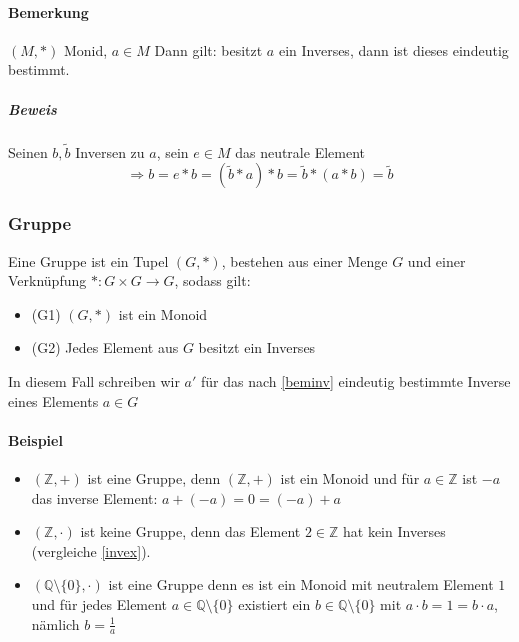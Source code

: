 \documentclass[a4paper]{scrartcl}
\begin{document}
\paragraph{Bemerkung}
\label{sec-3-1-3-2}
\label{beminv}
$(M,*)$ Monid, $a\in M$ Dann gilt: besitzt $a$ ein Inverses, dann ist dieses eindeutig bestimmt.
\subparagraph{Beweis}
\label{sec-3-1-3-2-1}
Seinen $b,\tilde b$ Inversen zu $a$, sein $e\in M$ das neutrale Element
\[\Rightarrow b = e * b = (\tilde b * a) * b = \tilde b * (a * b) = \tilde b\]
\subsubsection{Gruppe}
\label{sec-3-1-4}
Eine Gruppe ist ein Tupel $(G,*)$, bestehen aus einer Menge $G$ und einer Verknüpfung $*:G\times G \to G$, sodass gilt:
\begin{itemize}
\item (G1) $(G,*)$ ist ein Monoid
\item (G2) Jedes Element aus $G$ besitzt ein Inverses
\end{itemize}
In diesem Fall schreiben wir $a'$ für das nach \ref{beminv} eindeutig bestimmte Inverse eines Elements $a\in G$
\paragraph{Beispiel}
\label{sec-3-1-4-1}
\begin{itemize}
\item $(\mathbb{Z},+)$ ist eine Gruppe, denn $(\mathbb{Z},+)$ ist ein Monoid und für $a\in\mathbb{Z}$ ist $-a$ das inverse Element: $a + (-a) = 0 = (-a) + a$
\item $(\mathbb{Z},\cdot)$ ist keine Gruppe, denn das Element $2\in\mathbb{Z}$ hat kein Inverses (vergleiche \ref{invex}).
\item $(\mathbb{Q}\setminus \{0\},\cdot)$ ist eine Gruppe denn es ist ein Monoid mit neutralem Element $1$ und für jedes Element $a\in\mathbb{Q}\setminus\{0\}$ existiert ein $b\in \mathbb{Q}\setminus \{0\}$ mit $a\cdot b = 1 = b\cdot a$, nämlich $b = \frac{1}{a}$
\end{itemize}
\end{document}
